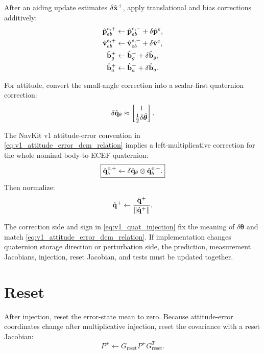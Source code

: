 After an aiding update estimates $\delta\hat{\mathbf{x}}^{+}$, apply translational and
bias corrections additively:
\begin{align}
\hat{\mathbf{p}}_{eb}^{e,+} &\leftarrow \hat{\mathbf{p}}_{eb}^{e,-} + \delta\hat{\mathbf{p}}^{e},\\
\hat{\mathbf{v}}_{eb}^{e,+} &\leftarrow \hat{\mathbf{v}}_{eb}^{e,-} + \delta\hat{\mathbf{v}}^{e},\\
\hat{\mathbf{b}}_g^{+} &\leftarrow \hat{\mathbf{b}}_g^{-} + \delta\hat{\mathbf{b}}_g,\\
\hat{\mathbf{b}}_a^{+} &\leftarrow \hat{\mathbf{b}}_a^{-} + \delta\hat{\mathbf{b}}_a.
\end{align}

For attitude, convert the small-angle correction into a scalar-first quaternion
correction:
\begin{equation}
\delta\hat{\mathbf{q}}_{\theta}
\approx
\begin{bmatrix}
1\\
\frac{1}{2}\delta\hat{\boldsymbol{\theta}}
\end{bmatrix}.
\end{equation}

The NavKit v1 attitude-error convention in
\cref{eq:v1_attitude_error_dcm_relation} implies a left-multiplicative
correction for the whole nominal body-to-ECEF quaternion:
\begin{equation}
\boxed{
\hat{\mathbf{q}}_{b}^{e,+}
\leftarrow
\delta\hat{\mathbf{q}}_{\theta}
\otimes
\hat{\mathbf{q}}_{b}^{e,-}.
}
\label{eq:v1_quat_injection}
\end{equation}
Then normalize:
\begin{equation}
\hat{\mathbf{q}}^{+}
\leftarrow
\frac{\hat{\mathbf{q}}^{+}}{\left\lVert \hat{\mathbf{q}}^{+} \right\rVert}.
\end{equation}

\begin{warningbox}
The correction side and sign in
\cref{eq:v1_quat_injection} fix the meaning of
$\delta\boldsymbol{\theta}$ and match
\cref{eq:v1_attitude_error_dcm_relation}. If implementation changes quaternion
storage direction or perturbation side, the prediction, measurement Jacobians,
injection, reset Jacobian, and tests must be updated together.
\end{warningbox}

\section{Reset}

After injection, reset the error-state mean to zero. Because attitude-error
coordinates change after multiplicative injection, reset the covariance with a
reset Jacobian:
\begin{equation}
P^{+}
\leftarrow
G_{\text{reset}}P^{+}G_{\text{reset}}^T.
\label{eq:v1_reset_covariance_update}
\end{equation}


